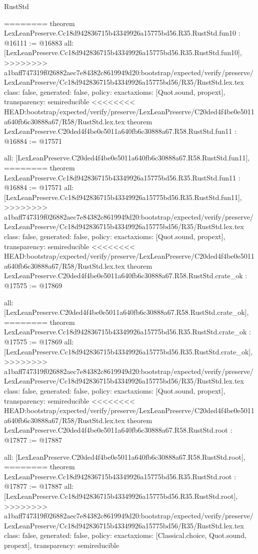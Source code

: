 \begin{lexlean}{RustStd}
\begin{coremodule}
{\begin{coremodule}
{{{{{{{{{{{{{========
theorem LexLeanPreserve.Cc18d942836715b43349926a15775bd56.R35.RustStd.fun10 : @16111 := @16883 {
  all: [LexLeanPreserve.Cc18d942836715b43349926a15775bd56.R35.RustStd.fun10],
>>>>>>>> a1baff747319f026882aec7e84382c8619949d20:bootstrap/expected/verify/preserve/LexLeanPreserve/Cc18d942836715b43349926a15775bd56/R35/RustStd.lex.tex
  class: false,
  generated: false,
  policy: exact{axioms: [Quot.sound, propext]},
  transparency: semireducible
}
<<<<<<<< HEAD:bootstrap/expected/verify/preserve/LexLeanPreserve/C20ded4f4be0e5011a640fb6c30888a67/R58/RustStd.lex.tex
theorem LexLeanPreserve.C20ded4f4be0e5011a640fb6c30888a67.R58.RustStd.fun11 : @16884 := @17571 {
  all: [LexLeanPreserve.C20ded4f4be0e5011a640fb6c30888a67.R58.RustStd.fun11],
========
theorem LexLeanPreserve.Cc18d942836715b43349926a15775bd56.R35.RustStd.fun11 : @16884 := @17571 {
  all: [LexLeanPreserve.Cc18d942836715b43349926a15775bd56.R35.RustStd.fun11],
>>>>>>>> a1baff747319f026882aec7e84382c8619949d20:bootstrap/expected/verify/preserve/LexLeanPreserve/Cc18d942836715b43349926a15775bd56/R35/RustStd.lex.tex
  class: false,
  generated: false,
  policy: exact{axioms: [Quot.sound, propext]},
  transparency: semireducible
}
<<<<<<<< HEAD:bootstrap/expected/verify/preserve/LexLeanPreserve/C20ded4f4be0e5011a640fb6c30888a67/R58/RustStd.lex.tex
theorem LexLeanPreserve.C20ded4f4be0e5011a640fb6c30888a67.R58.RustStd.crate_ok : @17575 := @17869 {
  all: [LexLeanPreserve.C20ded4f4be0e5011a640fb6c30888a67.R58.RustStd.crate_ok],
========
theorem LexLeanPreserve.Cc18d942836715b43349926a15775bd56.R35.RustStd.crate_ok : @17575 := @17869 {
  all: [LexLeanPreserve.Cc18d942836715b43349926a15775bd56.R35.RustStd.crate_ok],
>>>>>>>> a1baff747319f026882aec7e84382c8619949d20:bootstrap/expected/verify/preserve/LexLeanPreserve/Cc18d942836715b43349926a15775bd56/R35/RustStd.lex.tex
  class: false,
  generated: false,
  policy: exact{axioms: [Quot.sound, propext]},
  transparency: semireducible
}
<<<<<<<< HEAD:bootstrap/expected/verify/preserve/LexLeanPreserve/C20ded4f4be0e5011a640fb6c30888a67/R58/RustStd.lex.tex
theorem LexLeanPreserve.C20ded4f4be0e5011a640fb6c30888a67.R58.RustStd.root : @17877 := @17887 {
  all: [LexLeanPreserve.C20ded4f4be0e5011a640fb6c30888a67.R58.RustStd.root],
========
theorem LexLeanPreserve.Cc18d942836715b43349926a15775bd56.R35.RustStd.root : @17877 := @17887 {
  all: [LexLeanPreserve.Cc18d942836715b43349926a15775bd56.R35.RustStd.root],
>>>>>>>> a1baff747319f026882aec7e84382c8619949d20:bootstrap/expected/verify/preserve/LexLeanPreserve/Cc18d942836715b43349926a15775bd56/R35/RustStd.lex.tex
  class: false,
  generated: false,
  policy: exact{axioms: [Classical.choice, Quot.sound, propext]},
  transparency: semireducible
}

}}}}}}}}}}}}}}}}
\end{coremodule}}
\end{coremodule}
\end{lexlean}
